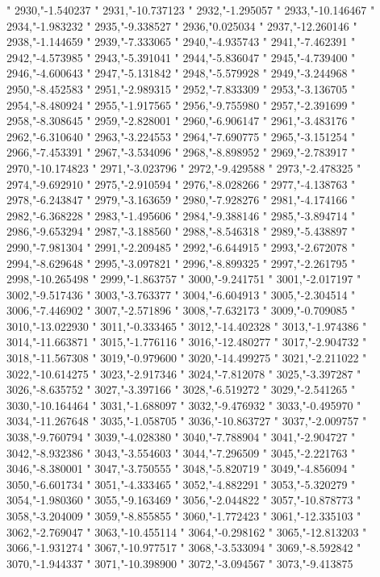 "
2930,"-1.540237
"
2931,"-10.737123
"
2932,"-1.295057
"
2933,"-10.146467
"
2934,"-1.983232
"
2935,"-9.338527
"
2936,"0.025034
"
2937,"-12.260146
"
2938,"-1.144659
"
2939,"-7.333065
"
2940,"-4.935743
"
2941,"-7.462391
"
2942,"-4.573985
"
2943,"-5.391041
"
2944,"-5.836047
"
2945,"-4.739400
"
2946,"-4.600643
"
2947,"-5.131842
"
2948,"-5.579928
"
2949,"-3.244968
"
2950,"-8.452583
"
2951,"-2.989315
"
2952,"-7.833309
"
2953,"-3.136705
"
2954,"-8.480924
"
2955,"-1.917565
"
2956,"-9.755980
"
2957,"-2.391699
"
2958,"-8.308645
"
2959,"-2.828001
"
2960,"-6.906147
"
2961,"-3.483176
"
2962,"-6.310640
"
2963,"-3.224553
"
2964,"-7.690775
"
2965,"-3.151254
"
2966,"-7.453391
"
2967,"-3.534096
"
2968,"-8.898952
"
2969,"-2.783917
"
2970,"-10.174823
"
2971,"-3.023796
"
2972,"-9.429588
"
2973,"-2.478325
"
2974,"-9.692910
"
2975,"-2.910594
"
2976,"-8.028266
"
2977,"-4.138763
"
2978,"-6.243847
"
2979,"-3.163659
"
2980,"-7.928276
"
2981,"-4.174166
"
2982,"-6.368228
"
2983,"-1.495606
"
2984,"-9.388146
"
2985,"-3.894714
"
2986,"-9.653294
"
2987,"-3.188560
"
2988,"-8.546318
"
2989,"-5.438897
"
2990,"-7.981304
"
2991,"-2.209485
"
2992,"-6.644915
"
2993,"-2.672078
"
2994,"-8.629648
"
2995,"-3.097821
"
2996,"-8.899325
"
2997,"-2.261795
"
2998,"-10.265498
"
2999,"-1.863757
"
3000,"-9.241751
"
3001,"-2.017197
"
3002,"-9.517436
"
3003,"-3.763377
"
3004,"-6.604913
"
3005,"-2.304514
"
3006,"-7.446902
"
3007,"-2.571896
"
3008,"-7.632173
"
3009,"-0.709085
"
3010,"-13.022930
"
3011,"-0.333465
"
3012,"-14.402328
"
3013,"-1.974386
"
3014,"-11.663871
"
3015,"-1.776116
"
3016,"-12.480277
"
3017,"-2.904732
"
3018,"-11.567308
"
3019,"-0.979600
"
3020,"-14.499275
"
3021,"-2.211022
"
3022,"-10.614275
"
3023,"-2.917346
"
3024,"-7.812078
"
3025,"-3.397287
"
3026,"-8.635752
"
3027,"-3.397166
"
3028,"-6.519272
"
3029,"-2.541265
"
3030,"-10.164464
"
3031,"-1.688097
"
3032,"-9.476932
"
3033,"-0.495970
"
3034,"-11.267648
"
3035,"-1.058705
"
3036,"-10.863727
"
3037,"-2.009757
"
3038,"-9.760794
"
3039,"-4.028380
"
3040,"-7.788904
"
3041,"-2.904727
"
3042,"-8.932386
"
3043,"-3.554603
"
3044,"-7.296509
"
3045,"-2.221763
"
3046,"-8.380001
"
3047,"-3.750555
"
3048,"-5.820719
"
3049,"-4.856094
"
3050,"-6.601734
"
3051,"-4.333465
"
3052,"-4.882291
"
3053,"-5.320279
"
3054,"-1.980360
"
3055,"-9.163469
"
3056,"-2.044822
"
3057,"-10.878773
"
3058,"-3.204009
"
3059,"-8.855855
"
3060,"-1.772423
"
3061,"-12.335103
"
3062,"-2.769047
"
3063,"-10.455114
"
3064,"-0.298162
"
3065,"-12.813203
"
3066,"-1.931274
"
3067,"-10.977517
"
3068,"-3.533094
"
3069,"-8.592842
"
3070,"-1.944337
"
3071,"-10.398900
"
3072,"-3.094567
"
3073,"-9.413875
